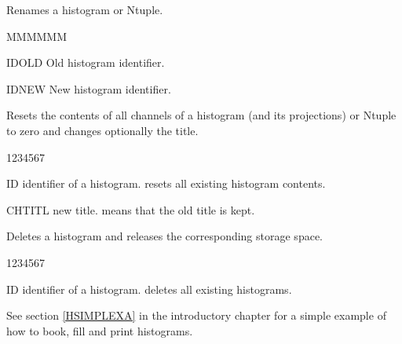  
 
\Action Renames a histogram or Ntuple.

\Idesc
\begin{DLttc}{MMMMMM}
\item[IDOLD]  Old histogram identifier.
\item[IDNEW]  New histogram identifier.
\end{DLttc}

 
\Action Resets the contents of all channels of a histogram
(and its projections) or Ntuple to zero and changes optionally the title.

\Idesc
\begin{DLttc}{1234567}
\item[ID] identifier of a histogram.
           resets all existing histogram contents.
\item[CHTITL] new title.
           means that the old title is kept.
\end{DLttc}
 
 
\Action Deletes a histogram and releases the corresponding storage space.
 
\Idesc
\begin{DLttc}{1234567}
\item[ID] identifier of a histogram.  deletes all existing histograms.
\end{DLttc}

 
See section \ref{HSIMPLEXA} in the introductory chapter for a simple
example of how to book, fill and print histograms.

\endinput

